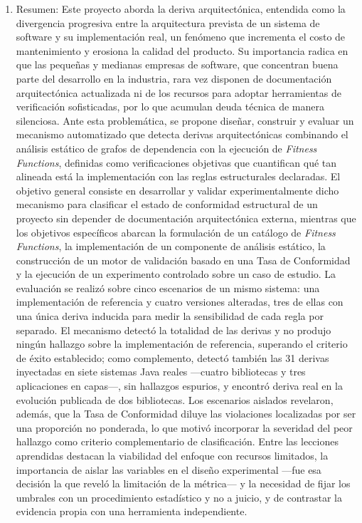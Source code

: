 \begin{enumerate}
    \item Resumen: Este proyecto aborda la deriva arquitectónica, entendida como la divergencia progresiva entre la arquitectura prevista de un sistema de software y su implementación real, un fenómeno que incrementa el costo de mantenimiento y erosiona la calidad del producto. Su importancia radica en que las pequeñas y medianas empresas de software, que concentran buena parte del desarrollo en la industria, rara vez disponen de documentación arquitectónica actualizada ni de los recursos para adoptar herramientas de verificación sofisticadas, por lo que acumulan deuda técnica de manera silenciosa. Ante esta problemática, se propone diseñar, construir y evaluar un mecanismo automatizado que detecta derivas arquitectónicas combinando el análisis estático de grafos de dependencia con la ejecución de \textit{Fitness Functions}, definidas como verificaciones objetivas que cuantifican qué tan alineada está la implementación con las reglas estructurales declaradas. El objetivo general consiste en desarrollar y validar experimentalmente dicho mecanismo para clasificar el estado de conformidad estructural de un proyecto sin depender de documentación arquitectónica externa, mientras que los objetivos específicos abarcan la formulación de un catálogo de \textit{Fitness Functions}, la implementación de un componente de análisis estático, la construcción de un motor de validación basado en una Tasa de Conformidad y la ejecución de un experimento controlado sobre un caso de estudio. La evaluación se realizó sobre cinco escenarios de un mismo sistema: una implementación de referencia y cuatro versiones alteradas, tres de ellas con una única deriva inducida para medir la sensibilidad de cada regla por separado. El mecanismo detectó la totalidad de las derivas y no produjo ningún hallazgo sobre la implementación de referencia, superando el criterio de éxito establecido; como complemento, detectó también las 31 derivas inyectadas en siete sistemas Java reales ---cuatro bibliotecas y tres aplicaciones en capas---, sin hallazgos espurios, y encontró deriva real en la evolución publicada de dos bibliotecas. Los escenarios aislados revelaron, además, que la Tasa de Conformidad diluye las violaciones localizadas por ser una proporción no ponderada, lo que motivó incorporar la severidad del peor hallazgo como criterio complementario de clasificación. Entre las lecciones aprendidas destacan la viabilidad del enfoque con recursos limitados, la importancia de aislar las variables en el diseño experimental —fue esa decisión la que reveló la limitación de la métrica— y la necesidad de fijar los umbrales con un procedimiento estadístico y no a juicio, y de contrastar la evidencia propia con una herramienta independiente.
\end{enumerate}
